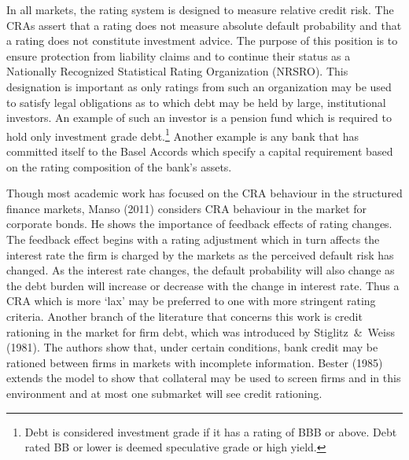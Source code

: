 \documentclass[titlepage]{article}
\begin{document}
In all markets, the rating system is designed to measure relative credit risk. The CRAs assert that a rating does not measure absolute default probability and that a rating does not constitute investment advice. The purpose of this position is to ensure protection from liability claims and to continue their status as a Nationally Recognized Statistical Rating Organization (NRSRO). This designation is important as only ratings from such an organization may be used to satisfy legal obligations as to which debt may be held by large, institutional investors. An example of such an investor is a pension fund which is required to hold only investment grade debt.\footnote{Debt is considered investment grade if it has a rating of BBB or above. Debt rated BB or lower is deemed speculative grade or high yield.} Another example is any bank that has committed itself to the Basel Accords which specify a capital requirement based on the rating composition of the bank's assets.

Though most academic work has focused on the CRA behaviour in the structured finance markets, Manso (2011) considers CRA behaviour in the market for corporate bonds. He shows the importance of feedback effects of rating changes. The feedback effect begins with a rating adjustment which in turn affects the interest rate the firm is charged by the markets as the perceived default risk has changed. As the interest rate changes, the default probability will also change as the debt burden will increase or decrease with the change in interest rate. Thus a CRA which is more `lax' may be preferred to one with more stringent rating criteria. Another branch of the literature that concerns this work is credit rationing in the market for firm debt, which was introduced by Stiglitz~\&~Weiss (1981). The authors show that, under certain conditions, bank credit may be rationed between firms in markets with incomplete information. Bester (1985) extends the model to show that collateral may be used to screen firms and in this environment and at most one submarket will see credit rationing.
\end{document}
